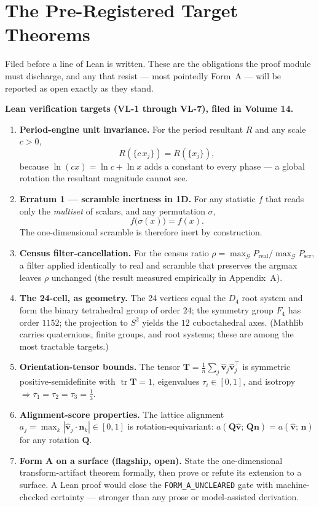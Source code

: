 \documentclass[11pt, letterpaper, openany]{book}
\newcommand{\uvec}[1]{\hat{\mathbf{#1}}}
\begin{document}
\section{The Pre-Registered Target Theorems}

Filed before a line of Lean is written. These are the obligations the proof module must discharge,
and any that resist --- most pointedly Form~A --- will be reported as open exactly as they stand.

\begin{predictionbox}
\textbf{Lean verification targets (VL-1 through VL-7), filed in Volume 14.}
\begin{enumerate}
    \item \textbf{Period-engine unit invariance.} For the period resultant $R$ and any scale $c>0$,
          \[ R(\{c\,x_j\}) = R(\{x_j\}), \]
          because $\ln(c x) = \ln c + \ln x$ adds a constant to every phase --- a global rotation
          the resultant magnitude cannot see.
    \item \textbf{Erratum 1 --- scramble inertness in 1D.} For any statistic $f$ that reads only the
          \emph{multiset} of scalars, and any permutation $\sigma$,
          \[ f\big(\sigma(x)\big) = f(x). \]
          The one-dimensional scramble is therefore inert by construction.
    \item \textbf{Census filter-cancellation.} For the census ratio
          $\rho = \max_{\mathcal{G}} P_{\mathrm{real}} / \max_{\mathcal{G}} P_{\mathrm{scr}}$, a
          filter applied identically to real and scramble that preserves the argmax leaves $\rho$
          unchanged (the result measured empirically in Appendix~A).
    \item \textbf{The 24-cell, as geometry.} The 24 vertices equal the $D_4$ root system and form the
          binary tetrahedral group of order $24$; the symmetry group $F_4$ has order $1152$; the
          projection to $S^2$ yields the $12$ cuboctahedral axes. (Mathlib carries quaternions, finite
          groups, and root systems; these are among the most tractable targets.)
    \item \textbf{Orientation-tensor bounds.} The tensor $\mathbf{T} = \tfrac1n\sum_j \uvec{v}_j
          \uvec{v}_j^{\!\top}$ is symmetric positive-semidefinite with $\operatorname{tr}\mathbf{T}=1$,
          eigenvalues $\tau_i \in [0,1]$, and isotropy $\Rightarrow \tau_1=\tau_2=\tau_3=\tfrac13$.
    \item \textbf{Alignment-score properties.} The lattice alignment $a_j = \max_k |\uvec{v}_j \cdot
          \mathbf{n}_k| \in [0,1]$ is rotation-equivariant: $a(\mathbf{Q}\uvec{v};\,\mathbf{Q}\mathbf{n})
          = a(\uvec{v};\,\mathbf{n})$ for any rotation $\mathbf{Q}$.
    \item \textbf{Form A on a surface (flagship, open).} State the one-dimensional transform-artifact
          theorem formally, then prove or refute its extension to a surface. A Lean proof would close
          the \texttt{FORM\_A\_UNCLEARED} gate with machine-checked certainty --- stronger than any
          prose or model-assisted derivation.
\end{enumerate}
\end{predictionbox}
\end{document}

